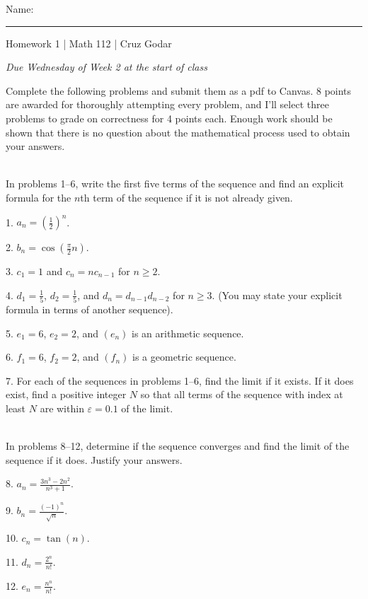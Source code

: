 \documentclass{article}
\begin{document}
\Large Name: \rule{2in}{0.15mm} \hfill Homework 1 | Math 112 | Cruz Godar \vspace{4pt} \normalsize

\textit{Due Wednesday of Week 2 at the start of class}

Complete the following problems and submit them as a pdf to Canvas. 8 points are awarded for thoroughly attempting every problem, and I'll select three problems to grade on correctness for 4 points each. Enough work should be shown that there is no question about the mathematical process used to obtain your answers. 

~\\

In problems 1--6, write the first five terms of the sequence and find an explicit formula for the $n$th term of the sequence if it is not already given.

1. $\displaystyle a_n = \left( \frac{1}{2} \right)^n$.

2. $\displaystyle b_n = \cos\left( \frac{\pi}{2} n \right)$.

3. $\displaystyle c_1 = 1$ and $\displaystyle c_n = nc_{n - 1}$ for $n \geq 2$.

4. $\displaystyle d_1 = \frac{1}{5}$, $\displaystyle d_2 = \frac{1}{5}$, and $d_n = d_{n - 1}d_{n - 2}$ for $n \geq 3$. (You may state your explicit formula in terms of another sequence).

5. $e_1 = 6$, $e_2 = 2$, and $(e_n)$ is an arithmetic sequence.

6. $f_1 = 6$, $f_2 = 2$, and $(f_n)$ is a geometric sequence.

7. For each of the sequences in problems 1--6, find the limit if it exists. If it does exist, find a positive integer $N$ so that all terms of the sequence with index at least $N$ are within $\varepsilon = 0.1$ of the limit.

~\\

In problems 8--12, determine if the sequence converges and find the limit of the sequence if it does. Justify your answers.

8. $\displaystyle a_n = \frac{3n^3 - 2n^2}{n^3 + 1}$.

9. $\displaystyle b_n = \frac{(-1)^n}{\sqrt{n}}$.

10. $\displaystyle c_n = \tan(n)$.

11. $\displaystyle d_n = \frac{2^n}{n!}$.

12. $\displaystyle e_n = \frac{n^n}{n!}$.
\end{document}
